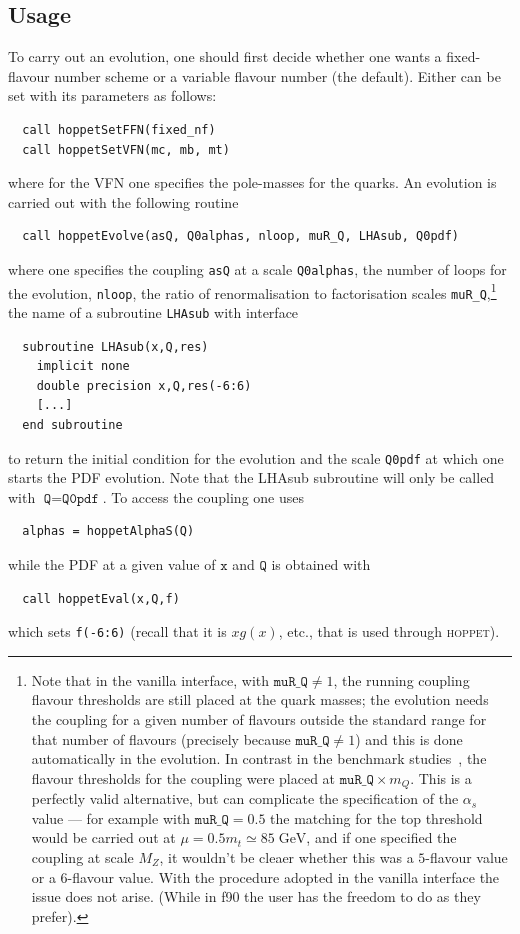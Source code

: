 \documentclass[12pt]{article}
\newcommand{\GeV}{\;\mathrm{GeV}}
\newcommand{\as}{\alpha_s}
\newcommand{\hoppet}{\textsc{hoppet}\xspace}
\newcommand{\ttt}[1]{\texttt{#1}}
\begin{document}
\subsection{Usage}
\label{sec:vanilla_usage}

To carry out an evolution, one should first decide whether one wants a
fixed-flavour number scheme or a variable flavour number (the
default). Either can be set with its parameters as follows:
\begin{verbatim}
  call hoppetSetFFN(fixed_nf)
  call hoppetSetVFN(mc, mb, mt)
\end{verbatim}
where for the VFN one specifies the pole-masses for the quarks. An
evolution is carried out with the following routine
\begin{verbatim}
  call hoppetEvolve(asQ, Q0alphas, nloop, muR_Q, LHAsub, Q0pdf)
\end{verbatim}
where one specifies the coupling \ttt{asQ} at a scale \ttt{Q0alphas},
the number of loops for the evolution, \ttt{nloop}, the ratio of
renormalisation to factorisation scales \ttt{muR\_Q},\footnote{Note
  that in the vanilla interface, with $\ttt{muR\_Q}\ne 1$, the running
  coupling flavour thresholds are still placed at the quark masses;
  the evolution needs the coupling for a given number of flavours
  outside the standard range for that number of flavours (precisely
  because $\ttt{muR\_Q}\ne 1$) and this is done automatically in the
  evolution. In contrast in the benchmark studies~\cite{Benchmarks},
  the flavour thresholds for the coupling were placed at $\ttt{muR\_Q}
  \times m_Q$.  This is a perfectly valid alternative, but can
  complicate the specification of the $\as$ value --- for example with
  $\ttt{muR\_Q} = 0.5$ the matching for the top threshold would be
  carried out at $\mu = 0.5 m_t \simeq 85 \GeV$, and if one specified
  the coupling at scale $M_Z$, it wouldn't be cleaer whether this was
  a $5$-flavour value or a $6$-flavour value. With the procedure
  adopted in the vanilla interface the issue does not arise. (While in
  f90 the user has the freedom to do as they prefer). } %
the name of a subroutine \ttt{LHAsub} with interface
\begin{verbatim}
  subroutine LHAsub(x,Q,res)
    implicit none
    double precision x,Q,res(-6:6)
    [...]
  end subroutine 
\end{verbatim}
to return the initial condition for the evolution and the scale
\ttt{Q0pdf} at which one starts the PDF evolution. Note that the
LHAsub subroutine will only be called with $\ttt{Q}=\ttt{Q0pdf}$.
To access the coupling one uses
\begin{verbatim}
  alphas = hoppetAlphaS(Q)
\end{verbatim}
while the PDF at a given value of $\ttt{x}$ and $\ttt{Q}$ is obtained with 
\begin{verbatim}
  call hoppetEval(x,Q,f)
\end{verbatim}
which sets \ttt{f(-6:6)} (recall that it is $xg(x)$, etc., that is
used through \hoppet).
\end{document}
